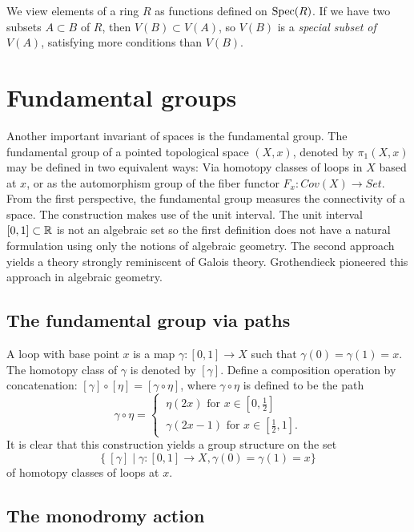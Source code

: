We view elements of a ring $R$ as functions defined on $\operatorname{Spec}(R)$. If we have two subsets $A \subset B$ of $R$, then $V(B) \subset V(A)$, so $V(B)$ is a \textit{special subset of $V(A)$}, satisfying more conditions than $V(B)$.


\section{Fundamental groups}
Another important invariant of spaces is the fundamental group. The fundamental group of a pointed topological space $(X,x)$, denoted by $\pi_1(X,x)$ may be defined in two equivalent ways: Via homotopy classes of loops in $X$ based at $x$, or as the automorphism group of the fiber functor $F_x: Cov(X) \to Set$. From the first perspective, the fundamental group measures the connectivity of a space. The construction makes use of the unit interval. The unit interval $[0,1] \subset \mathbb{R}$ is not an algebraic set so the first definition does not have a natural formulation using only the notions of algebraic geometry. The second approach yields a theory strongly reminiscent of Galois theory. Grothendieck pioneered this approach in algebraic geometry.

\subsection{The fundamental group via paths}
A loop with base point $x$ is a map $\gamma : [0,1] \to X$ such that $\gamma(0) = \gamma(1) = x$. The homotopy class of $\gamma $ is denoted by $[\gamma]$. Define a composition operation by concatenation: $[\gamma] \circ [\eta] = [\gamma \circ \eta]$, where $\gamma \circ \eta$ is defined to be the path
\[
	\gamma \circ \eta =
	\begin{cases}
		\ \eta(2x) \text{ for } x \in [0, \tfrac{1}{2}] \\
		\ \gamma(2x - 1) \text{ for } x \in [\tfrac{1}{2}, 1].
	\end{cases}
\]
It is clear that this construction yields a group structure on the set
\[
	\{\ [\gamma] \mid \gamma : [0,1] \to X , \gamma(0) = \gamma(1) = x \}
\]
of homotopy classes of loops at $x$.

\subsection{The monodromy action}

